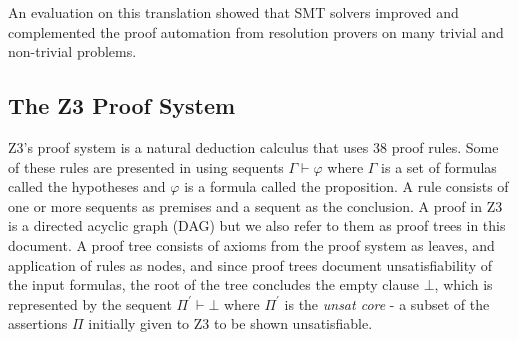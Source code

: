 \documentclass{article}
\begin{document}
		An evaluation on this translation showed that SMT 
		solvers improved and complemented the proof automation 
		from resolution provers on many trivial and non-trivial 
		problems.
		
	\subsection{The Z3 Proof System}
		Z3's proof system is a natural deduction 
		calculus that uses 38 proof rules. Some of 
		these rules are presented in 
		using sequents $\Gamma \vdash \varphi$ where 
		$\Gamma$ is a set of formulas called the hypotheses
		and $\varphi$ is a formula called the proposition. 
		A rule consists of one or more sequents as 
		premises and a sequent as the conclusion. A
		proof in Z3 is a directed acyclic graph (DAG)
		but we also refer to them as proof trees in
		this document. A proof tree consists of axioms 
		from the proof system as leaves, and application 
		of rules as nodes, and since proof trees 
		document unsatisfiability of the input 
		formulas, the root of the tree concludes the 
		empty clause $\bot$, which is represented by 
		the sequent $\Pi^\prime \vdash \bot$ where 
		$\Pi^\prime$ is the \textit{unsat core} - 
		a subset of the assertions $\Pi$
		initially given to Z3 to be shown unsatisfiable.
		
\end{document}
